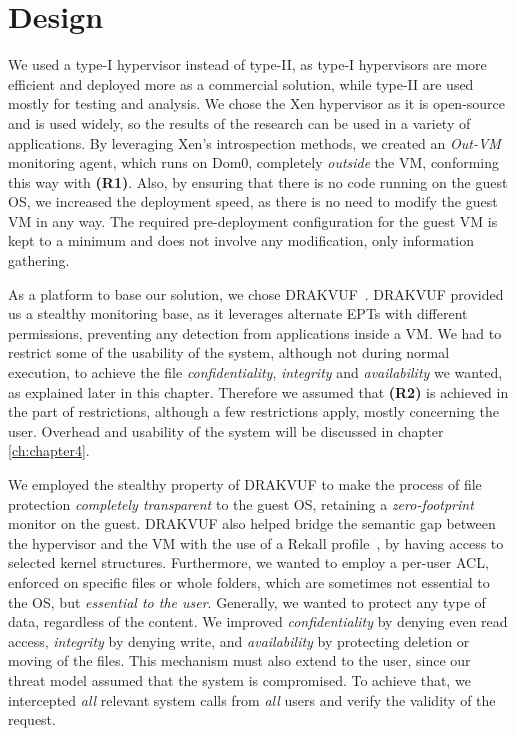 \section{Design}\label{sec:design}

\par We used a type-I hypervisor instead of type-II, as type-I hypervisors are more efficient and deployed more as a commercial solution, while type-II are used mostly for testing and analysis. We chose the Xen hypervisor as it is open-source and is used widely, so the results of the research can be used in a variety of applications. By leveraging Xen's introspection methods, we created an \emph{Out-VM} monitoring agent, which runs on Dom0, completely \emph{outside} the \ac{VM}, conforming this way with \textbf{(R1)}. Also, by ensuring that there is no code running on the guest \ac{OS}, we increased the deployment speed, as there is no need to modify the guest \ac{VM} in any way. The required pre-deployment configuration for the guest \ac{VM} is kept to a minimum and does not involve any modification, only information gathering.

\par As a platform to base our solution, we chose DRAKVUF~\cite{lengyel2014drakvuf}. DRAKVUF provided us a stealthy monitoring base, as it leverages alternate \ac{EPT}s with different permissions, preventing any detection from applications inside a \ac{VM}. We had to restrict some of the usability of the system, although not during normal execution, to achieve the file \emph{confidentiality}, \emph{integrity} and \emph{availability} we wanted, as explained later in this chapter. Therefore we assumed that \textbf{(R2)} is achieved in the part of restrictions, although a few restrictions apply, mostly concerning the  user. Overhead and usability of the system will be discussed in chapter \ref{ch:chapter4}.

\par We employed the stealthy property of DRAKVUF to make the process of file protection \emph{completely transparent} to the guest \ac{OS}, retaining a \emph{zero-footprint} monitor on the guest. DRAKVUF also helped bridge the semantic gap between the hypervisor and the \ac{VM} with the use of a Rekall profile~\cite{rekall}, by having access to selected kernel structures. Furthermore, we wanted to employ a per-user \ac{ACL}, enforced on specific files or whole folders, which are sometimes not essential to the \ac{OS}, but \emph{essential to the user}. Generally, we wanted to protect any type of data, regardless of the content. We improved \emph{confidentiality} by denying even read access, \emph{integrity} by denying write, and \emph{availability} by protecting deletion or moving of the files. This mechanism must also extend to the  user, since our threat model assumed that the system is compromised. To achieve that, we intercepted \emph{all} relevant system calls from \emph{all} users and verify the validity of the request. 

